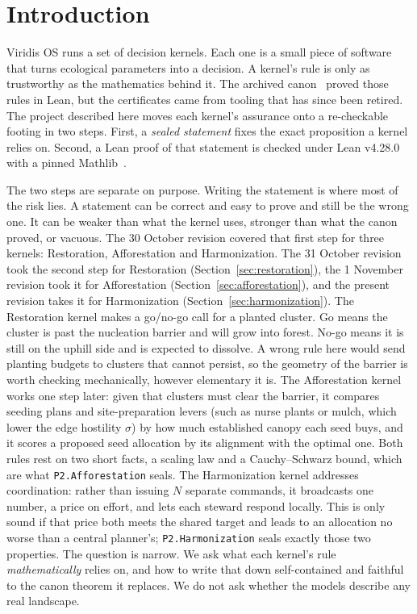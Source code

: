 \documentclass[11pt]{article}
\theoremstyle{definition}
\theoremstyle{remark}
\begin{document}
\section{Introduction}
Viridis OS runs a set of decision kernels. Each one is a small piece of software that turns ecological
parameters into a decision. A kernel's rule is only as trustworthy as the mathematics behind it.
The archived canon~\cite{HartCanon2026} proved those rules in Lean, but the certificates came from tooling that has
since been retired. The project described here moves each kernel's assurance onto a re-checkable footing in two steps.
First, a \emph{sealed statement} fixes the exact proposition a kernel relies on.
Second, a Lean proof of that statement is checked under Lean v4.28.0 with a pinned Mathlib~\cite{Mathlib2020}.

The two steps are separate on purpose. Writing the statement is where most of the risk lies.
A statement can be correct and easy to prove and still be the wrong one. It can be weaker than what the kernel uses,
stronger than what the canon proved, or vacuous. The 30 October revision covered that first step for three kernels:
Restoration, Afforestation and Harmonization.
The 31 October revision took the second step for Restoration (Section~\ref{sec:restoration}), the 1 November revision
took it for Afforestation (Section~\ref{sec:afforestation}), and the present revision takes it for Harmonization
(Section~\ref{sec:harmonization}).
The Restoration kernel makes a go/no-go call for a planted cluster. Go means the cluster is past the nucleation barrier
and will grow into forest. No-go means it is still on the uphill side and is expected to dissolve.
A wrong rule here would send planting budgets to clusters that cannot persist, so the geometry of the barrier is worth
checking mechanically, however elementary it is.
The Afforestation kernel works one step later: given that clusters must clear the barrier, it compares seeding plans and
site-preparation levers (such as nurse plants or mulch, which lower the edge hostility $\sigma$) by how much established canopy each seed buys,
and it scores a proposed seed allocation by its alignment with the optimal one.
Both rules rest on two short facts, a scaling law and a Cauchy--Schwarz bound, which are what \texttt{P2.Afforestation} seals.
The Harmonization kernel addresses coordination: rather than issuing $N$ separate commands, it broadcasts one number,
a price on effort, and lets each steward respond locally. This is only sound if that price both meets the shared target and
leads to an allocation no worse than a central planner's; \texttt{P2.Harmonization} seals exactly those two properties.
The question is narrow. We ask what each kernel's rule \emph{mathematically} relies on, and how to write that down
self-contained and faithful to the canon theorem it replaces. We do not ask whether the models describe any real landscape.
\end{document}
